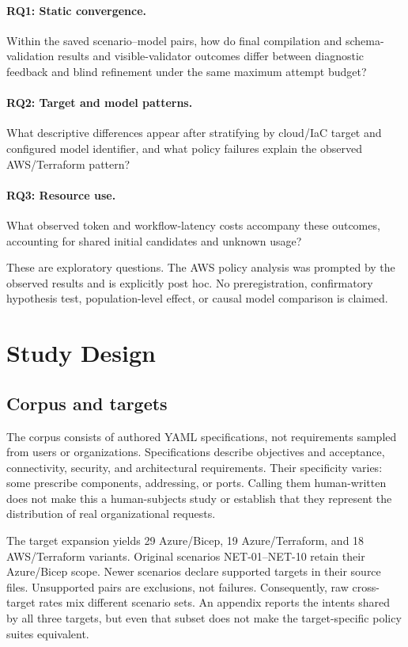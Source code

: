 \documentclass[11pt]{article}
\begin{document}
\paragraph{RQ1: Static convergence.}
Within the saved scenario--model pairs, how do final compilation and
schema-validation results and
visible-validator outcomes differ between diagnostic feedback and blind
refinement under the same maximum attempt budget?
\paragraph{RQ2: Target and model patterns.}
What descriptive differences appear after stratifying by cloud/IaC target and
configured model identifier, and what policy failures explain the observed
AWS/Terraform pattern?
\paragraph{RQ3: Resource use.}
What observed token and workflow-latency costs accompany these outcomes,
accounting for shared initial candidates and unknown usage?

These are exploratory questions. The AWS policy analysis was prompted by the
observed results and is explicitly post hoc. No preregistration, confirmatory
hypothesis test, population-level effect, or causal model comparison is claimed.

\section{Study Design}
\subsection{Corpus and targets}
The corpus consists of \SpecificationCount{} authored YAML specifications, not
requirements sampled from users or organizations. Specifications describe
objectives and acceptance, connectivity, security, and architectural requirements.
Their specificity varies: some prescribe components, addressing, or ports.
Calling them human-written does not make this a human-subjects study or establish
that they represent the distribution of real organizational requests.

The target expansion yields 29 Azure/Bicep, 19 Azure/Terraform, and 18
AWS/Terraform variants. Original scenarios NET-01--NET-10 retain their
Azure/Bicep scope. Newer scenarios declare supported targets in their source files.
Unsupported pairs are exclusions, not failures. Consequently, raw cross-target
rates mix different scenario sets. An appendix reports the
\MatchedIntentCount{} intents shared by all three targets, but even that subset
does not make the target-specific policy suites equivalent.
\end{document}
